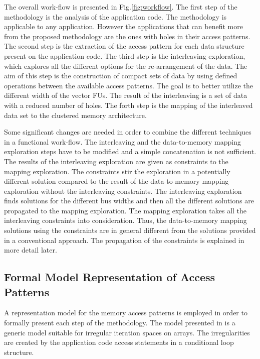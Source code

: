 \documentclass[prodmode,acmtecs]{acmsmall}
\begin{document}
The overall work-flow is presented in Fig.\ref{fig:workflow}. 
The first step of the methodology is the analysis of the application code. 
The methodology is applicable to any application.
However the applications that can benefit more from the proposed methodology are the ones with holes in their access patterns.
The second step is the extraction of the access pattern for each data structure present on the application code.
The third step is the interleaving exploration, which explores all the different options for the re-arrangement of the data.
The aim of this step is the construction of compact sets of data by using defined operations between the available access patterns.
The goal is to better utilize the different width of the vector FUs. 
The result of the interleaving is a set of data with a reduced number of holes.
The forth step is the mapping of the interleaved data set to the clustered memory architecture.

Some significant changes are needed in order to combine the different techniques in a functional work-flow.
The interleaving and the data-to-memory mapping exploration steps have to be modified and a simple concatenation is not sufficient.
The results of the interleaving exploration are given as constraints to the mapping exploration.
The constraints stir the exploration in a potentially different solution compared to the result of the data-to-memory mapping exploration without the interleaving constraints.
The interleaving exploration finds solutions for the different bus widths and then all the different solutions are propagated to the mapping exploration.
The mapping exploration takes all the interleaving constraints into consideration.
Thus, the data-to-memory mapping solutions using the constraints are in general different from the solutions provided in a conventional approach.
The propagation of the constraints is explained in more detail later. 

\subsection{Formal Model Representation of Access Patterns }

A representation model for the memory access patterns is employed in order to formally present each step of the methodology.
The model presented in \cite{Ang13} is a generic model suitable for irregular iteration spaces on arrays.
The irregularities are created by the application code access statements in a conditional loop structure.
\end{document}

